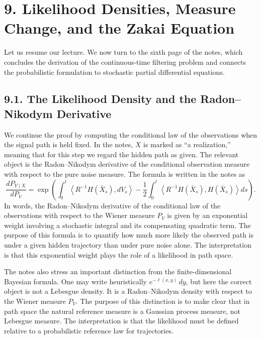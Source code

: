 \documentclass[11pt]{article}
\theoremstyle{definition}
\theoremstyle{remark}
\begin{document}
\section*{9. Likelihood Densities, Measure Change, and the Zakai Equation}
Let us resume our lecture. We now turn to the sixth page of the notes, which concludes the derivation of the continuous-time filtering problem and connects the probabilistic formulation to stochastic partial differential equations.

\subsection*{9.1. The Likelihood Density and the Radon--Nikodym Derivative}
We continue the proof by computing the conditional law of the observations when the signal path is held fixed. In the notes, $X$ is marked as ``a realization,'' meaning that for this step we regard the hidden path as given. The relevant object is the Radon--Nikodym derivative of the conditional observation measure with respect to the pure noise measure. The formula is written in the notes as
\[
\frac{dP_{Y\mid X}}{dP_V}
=
\exp\left(
\int_0^t \left\langle R^{-1}H(\bar X_s),dV_s\right\rangle
-\frac12\int_0^t \left\langle R^{-1}H(\bar X_s),H(\bar X_s)\right\rangle ds
\right).
\]
In words, the Radon--Nikodym derivative of the conditional law of the observations with respect to the Wiener measure $P_V$ is given by an exponential weight involving a stochastic integral and its compensating quadratic term. The purpose of this formula is to quantify how much more likely the observed path is under a given hidden trajectory than under pure noise alone.
The interpretation is that this exponential weight plays the role of a likelihood in path space.

The notes also stress an important distinction from the finite-dimensional Bayesian formula. One may write heuristically $e^{-\ell(x,y)}\,dy$, but here the correct object is not a Lebesgue density. It is a Radon--Nikodym density with respect to the Wiener measure $P_V$. The purpose of this distinction is to make clear that in path space the natural reference measure is a Gaussian process measure, not Lebesgue measure.
The interpretation is that the likelihood must be defined relative to a probabilistic reference law for trajectories.
\end{document}
